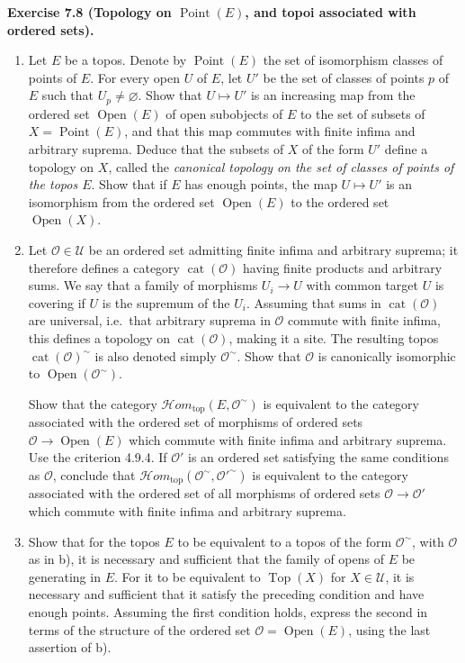 \documentclass[11pt]{article}
\newcommand{\U}{\mathcal{U}}
\newcommand{\Oo}{\mathcal{O}}
\newcommand{\Top}{\operatorname{Top}}
\newcommand{\Ouv}{\operatorname{Open}}
\newcommand{\Point}{\operatorname{Point}}
\newcommand{\cat}{\operatorname{cat}}
\newcommand{\Hhomtop}{\mathcal{H}om_{\mathrm{top}}}
\newcommand{\ie}{i.e.}
\newenvironment{remarktext}[1]{\par\medskip\noindent\textbf{#1.}\ }{\par\medskip}
\begin{document}
\begin{remarktext}{Exercise 7.8 (Topology on \(\Point(E)\), and topoi associated with ordered sets)}
\begin{enumerate}[label=\alph*)]
\item Let \(E\) be a topos. Denote by \(\Point(E)\) the set of isomorphism classes of points of \(E\). For every open \(U\) of \(E\), let \(U'\) be the set of classes of points \(p\) of \(E\) such that \(U_p\ne\varnothing\). Show that \(U\mapsto U'\) is an increasing map from the ordered set \(\Ouv(E)\) of open subobjects of \(E\) to the set of subsets of \(X=\Point(E)\), and that this map commutes with finite infima and arbitrary suprema. Deduce that the subsets of \(X\) of the form \(U'\) define a topology on \(X\), called the \emph{canonical topology on the set of classes of points of the topos \(E\)}. Show that if \(E\) has enough points, the map \(U\mapsto U'\) is an isomorphism from the ordered set \(\Ouv(E)\) to the ordered set \(\Ouv(X)\).

\item Let \(\Oo\in\U\) be an ordered set admitting finite infima and arbitrary suprema; it therefore defines a category \(\cat(\Oo)\) having finite products and arbitrary sums. We say that a family of morphisms \(U_i\to U\) with common target \(U\) is covering if \(U\) is the supremum of the \(U_i\). Assuming that sums in \(\cat(\Oo)\) are universal, \ie\ that arbitrary suprema in \(\Oo\) commute with finite infima, this defines a topology on \(\cat(\Oo)\), making it a site. The resulting topos \(\cat(\Oo)^{\sim}\) is also denoted simply \(\Oo^{\sim}\). Show that \(\Oo\) is canonically isomorphic to \(\Ouv(\Oo^{\sim})\).

Show that the category \(\Hhomtop(E,\Oo^{\sim})\) is equivalent to the category associated with the ordered set of morphisms of ordered sets \(\Oo\to\Ouv(E)\) which commute with finite infima and arbitrary suprema. Use the criterion 4.9.4. If \(\Oo'\) is an ordered set satisfying the same conditions as \(\Oo\), conclude that \(\Hhomtop(\Oo^{\sim},{\Oo'}^{\sim})\) is equivalent to the category associated with the ordered set of all morphisms of ordered sets \(\Oo\to\Oo'\) which commute with finite infima and arbitrary suprema.

\item Show that for the topos \(E\) to be equivalent to a topos of the form \(\Oo^{\sim}\), with \(\Oo\) as in b), it is necessary and sufficient that the family of opens of \(E\) be generating in \(E\). For it to be equivalent to \(\Top(X)\) for \(X\in\U\), it is necessary and sufficient that it satisfy the preceding condition and have enough points. Assuming the first condition holds, express the second in terms of the structure of the ordered set \(\Oo=\Ouv(E)\), using the last assertion of b).


\end{enumerate}
\end{remarktext}
\end{document}

